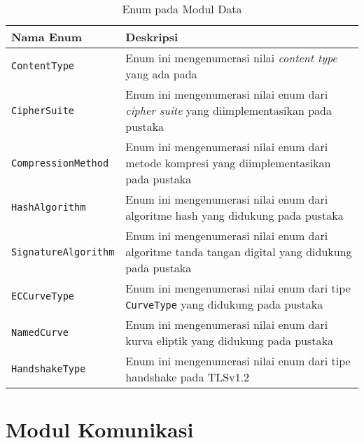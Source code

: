 \begin{table}[!h]
  \centering
  \caption{Enum pada Modul Data} \label{tab:impl.enum}
  \begin{tabular}{|p{3.75cm}|p{9cm}|}
    \hline
    Nama Enum & Deskripsi \\ \hline
    \texttt{ContentType} & Enum ini mengenumerasi nilai \emph{content type} yang ada pada \textcite{rfc5246} \\ \hline
    \texttt{CipherSuite} & Enum ini mengenumerasi nilai enum dari \emph{cipher suite} yang diimplementasikan pada pustaka \\ \hline
    \texttt{CompressionMethod} & Enum ini mengenumerasi nilai enum dari metode kompresi yang diimplementasikan pada pustaka \\ \hline
    \texttt{HashAlgorithm} & Enum ini mengenumerasi nilai enum dari algoritme hash yang didukung pada pustaka \\ \hline
    \texttt{SignatureAlgorithm} & Enum ini mengenumerasi nilai enum dari algoritme tanda tangan digital yang didukung pada pustaka \\ \hline
    \texttt{ECCurveType} & Enum ini mengenumerasi nilai enum dari tipe \texttt{CurveType} yang didukung pada pustaka\\ \hline
    \texttt{NamedCurve} & Enum ini mengenumerasi nilai enum dari kurva eliptik yang didukung pada pustaka\\ \hline
    \texttt{HandshakeType} & Enum ini mengenumerasi nilai enum dari tipe handshake pada TLSv1.2\\ \hline
  \end{tabular}
\end{table}

\section{Modul Komunikasi}


